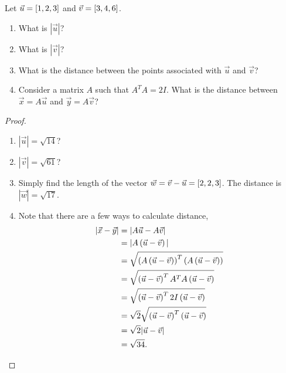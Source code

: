 \documentclass{tutorial}
\begin{document}
\begin{prob}
Let $\vec{u} = \left[ 1,2,3 \right]$ and $\vec{v} = \left[ 3,4,6 \right]$.
\begin{enumerate}[label=(\alph*)]
\item What is $|\vec{u}|$?
\item What is $|\vec{v}|$?
\item What is the distance between the points associated with $\vec{u}$ and $\vec{v}$?
\item Consider a matrix $A$ such that $A^TA = 2 I$. What is the distance between $\vec{x} = A \vec{u}$ and $\vec{y} = A \vec{v}$?
\end{enumerate}
\end{prob} \ifsolns \begin{proof} \mbox{}
\begin{enumerate}[label=(\alph*)]
\item $|\vec{u}| = \sqrt{14}$?
\item $|\vec{v}| = \sqrt{61}$?
\item Simply find the length of the vector $\vec{w} = \vec{v} - \vec{u} = \left[ 2, 2, 3 \right]$. The distance is $|\vec{w}| = \sqrt{17}$.
\item Note that there are a few ways to calculate distance,
\begin{align*}
  | \vec{x} - \vec{y} |
  & = | A\vec{u} - A \vec{v} | \\
  & = | A \left( \vec{u} - \vec{v} \right) | \\
  & = \sqrt{\left( A \left( \vec{u} - \vec{v} \right) \right)^T \left( A \left( \vec{u} - \vec{v} \right)\right)} \\
  & = \sqrt{\left( \vec{u} - \vec{v} \right)^T A^T A \left( \vec{u} - \vec{v}\right)} \\
  & = \sqrt{\left( \vec{u} - \vec{v} \right)^T 2I\left( \vec{u} - \vec{v}\right)} \\
  & = \sqrt{2}\sqrt{\left( \vec{u} - \vec{v} \right)^T \left( \vec{u} - \vec{v}\right)} \\
  & = \sqrt{2}| \vec{u} - \vec{v} | \\
  & = \sqrt{34} .
\end{align*}
\end{enumerate}
\end{proof} \fi
\end{document}
